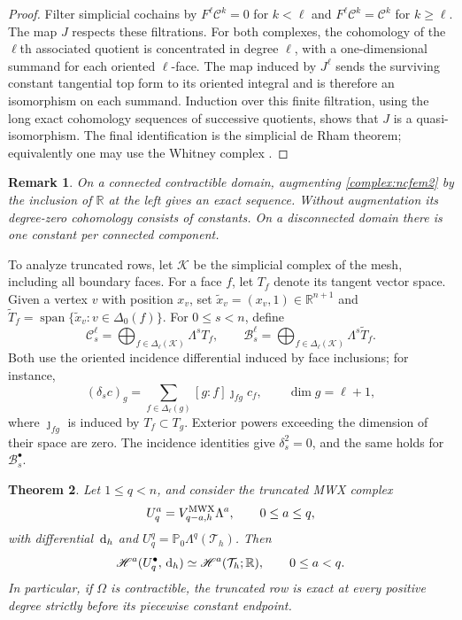 \documentclass[10pt]{amsart}
\numberwithin{equation}{section}
\newtheorem{theorem}{Theorem}[section]
\newtheorem{remark}[theorem]{Remark}
\newcommand{\dd}{\,{\rm d}}
\begin{document}
\begin{proof}
Filter simplicial cochains by
$F^\ell\mathcal C^k=0$ for $k<\ell$ and
$F^\ell\mathcal C^k=\mathcal C^k$ for $k\geq\ell$.
The map $J$ respects these filtrations. For both complexes, the
cohomology of the $\ell$th associated quotient is concentrated in degree
$\ell$, with a one-dimensional summand for each oriented $\ell$-face.
The map induced by $J^\ell$ sends the surviving constant tangential
top form to its oriented integral and is therefore an isomorphism
on each summand.
Induction over this finite filtration, using the long exact
cohomology sequences of successive quotients, shows that $J$ is a
quasi-isomorphism. The final identification is the simplicial de Rham
theorem; equivalently one may use the Whitney complex
\cite{Arnold2018,ArnoldFalkWinther2006}.
\end{proof}

\begin{remark}
On a connected contractible domain, augmenting
\eqref{complex:ncfem2} by the inclusion of $\mathbb R$ at the left
gives an exact sequence. Without augmentation its degree-zero
cohomology consists of constants. On a disconnected domain there is
one constant per connected component.
\end{remark}

To analyze truncated rows, let $\mathcal K$ be the simplicial complex of the
mesh, including all boundary faces. For a face $f$, let $T_f$ denote its
tangent vector space. Given a vertex $v$ with position $x_v$, set
$\widetilde x_v=(x_v,1)\in\mathbb R^{n+1}$ and
$\widetilde T_f=\operatorname{span}\{\widetilde x_v:v\in\Delta_0(f)\}$.
For $0\leq s<n$, define
\[
\mathcal C_s^\ell=\bigoplus_{f\in\Delta_\ell(\mathcal K)}\Lambda^sT_f,
\qquad
\mathcal B_s^\ell=\bigoplus_{f\in\Delta_\ell(\mathcal K)}
\Lambda^s\widetilde T_f.
\]
Both use the oriented incidence differential induced by face inclusions;
for instance,
\[
(\delta_s c)_g=\sum_{f\in\Delta_\ell(g)}[g:f]\jmath_{fg}c_f,
\qquad \dim g=\ell+1,
\]
where $\jmath_{fg}$ is induced by $T_f\subset T_g$.
Exterior powers exceeding the dimension of their space are zero.
The incidence identities give $\delta_s^2=0$, and the same holds for
$\mathcal B_s^\bullet$.

\begin{theorem}\label{thm:MWXtruncated}
Let $1\leq q<n$, and consider the truncated MWX complex
\[
U_q^a=V_{q-a,h}^{\rm MWX}\Lambda^a,\qquad 0\leq a\leq q,
\]
with differential $\dd_h$ and $U_q^q=\mathbb P_0\Lambda^q(\mathcal T_h)$.
Then
\[
\mathscr H^a(U_q^\bullet,\dd_h)\simeq \mathscr H^a(\mathcal T_h;\mathbb R),
\qquad 0\leq a<q.
\]
In particular, if $\Omega$ is contractible, the truncated row is exact
at every positive degree strictly before its piecewise constant endpoint.
\end{theorem}
\end{document}
